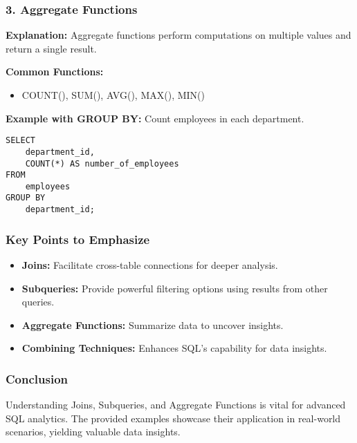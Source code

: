 \documentclass[aspectratio=169]{beamer}
\begin{document}
\begin{frame}[fragile]
    \frametitle{3. Aggregate Functions}
    \textbf{Explanation:} Aggregate functions perform computations on multiple values and return a single result.

    \textbf{Common Functions:} 
    \begin{itemize}
        \item COUNT(), SUM(), AVG(), MAX(), MIN()
    \end{itemize}

    \textbf{Example with GROUP BY:} Count employees in each department.
    \begin{lstlisting}
SELECT 
    department_id, 
    COUNT(*) AS number_of_employees
FROM 
    employees
GROUP BY 
    department_id;
    \end{lstlisting}
\end{frame}


\begin{frame}[fragile]
    \frametitle{Key Points to Emphasize}
    \begin{itemize}
        \item \textbf{Joins:} Facilitate cross-table connections for deeper analysis.
        \item \textbf{Subqueries:} Provide powerful filtering options using results from other queries.
        \item \textbf{Aggregate Functions:} Summarize data to uncover insights.
        \item \textbf{Combining Techniques:} Enhances SQL's capability for data insights.
    \end{itemize}
\end{frame}

\begin{frame}[fragile]
    \frametitle{Conclusion}
    Understanding Joins, Subqueries, and Aggregate Functions is vital for advanced SQL analytics. The provided examples showcase their application in real-world scenarios, yielding valuable data insights.
\end{frame}
\end{document}
